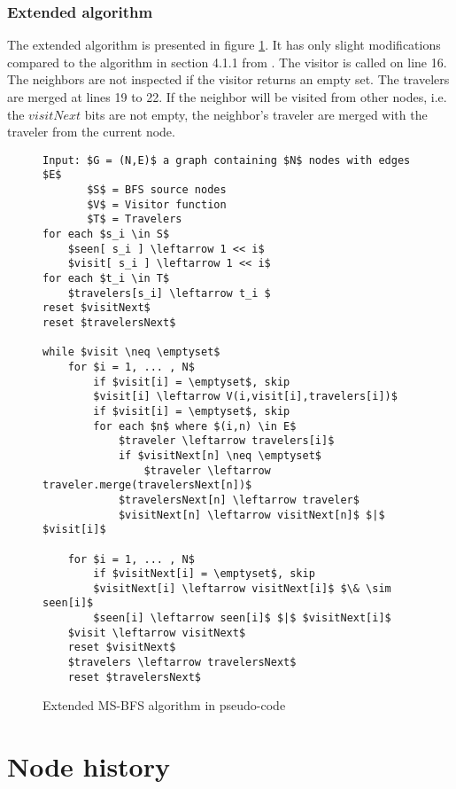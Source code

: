 \subsubsection{Extended algorithm}

The extended algorithm is presented in figure \ref{fig:extended_ms-bfs_algorithm}. It has only slight modifications compared to the algorithm in section 4.1.1 from \cite{msbfs}. The visitor is called on line 16. The neighbors are not inspected if the visitor returns an empty set. The travelers are merged at lines 19 to 22. If the neighbor will be visited from other nodes, i.e. the $visitNext$ bits are not empty, the neighbor's traveler are merged with the traveler from the current node.

\begin{figure}[h]
    \begin{lstlisting}[mathescape]
Input: $G = (N,E)$ a graph containing $N$ nodes with edges $E$
       $S$ = BFS source nodes
       $V$ = Visitor function
       $T$ = Travelers
for each $s_i \in S$
    $seen[ s_i ] \leftarrow 1 << i$
    $visit[ s_i ] \leftarrow 1 << i$
for each $t_i \in T$
    $travelers[s_i] \leftarrow t_i $
reset $visitNext$
reset $travelersNext$

while $visit \neq \emptyset$
    for $i = 1, ... , N$
        if $visit[i] = \emptyset$, skip
        $visit[i] \leftarrow V(i,visit[i],travelers[i])$
        if $visit[i] = \emptyset$, skip
        for each $n$ where $(i,n) \in E$
            $traveler \leftarrow travelers[i]$
            if $visitNext[n] \neq \emptyset$
                $traveler \leftarrow traveler.merge(travelersNext[n])$
            $travelersNext[n] \leftarrow traveler$
            $visitNext[n] \leftarrow visitNext[n]$ $|$ $visit[i]$

    for $i = 1, ... , N$
        if $visitNext[i] = \emptyset$, skip
        $visitNext[i] \leftarrow visitNext[i]$ $\& \sim seen[i]$
        $seen[i] \leftarrow seen[i]$ $|$ $visitNext[i]$
    $visit \leftarrow visitNext$
    reset $visitNext$
    $travelers \leftarrow travelersNext$
    reset $travelersNext$
    \end{lstlisting}
    \caption{Extended MS-BFS algorithm in pseudo-code}
    \label{fig:extended_ms-bfs_algorithm}
\end{figure}


\section{Node history}


